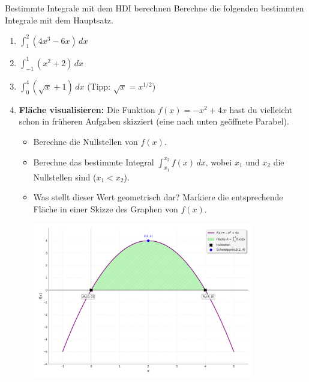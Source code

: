 \begin{aufgabenumgebung}{Bestimmte Integrale mit dem HDI berechnen}
Berechne die folgenden bestimmten Integrale mit dem Hauptsatz.
\begin{enumerate}
    \item $\int_{1}^{2} (4x^3 - 6x) \,dx$
    \item $\int_{-1}^{1} (x^2 + 2) \,dx$
    \item $\int_{0}^{4} (\sqrt{x} + 1) \,dx$ (Tipp: $\sqrt{x} = x^{1/2}$)
    \item \textbf{Fläche visualisieren:}
        Die Funktion $f(x) = -x^2 + 4x$ hast du vielleicht schon in früheren Aufgaben skizziert (eine nach unten geöffnete Parabel).
        \begin{itemize}
            \item Berechne die Nullstellen von $f(x)$.
            \item Berechne das bestimmte Integral $\int_{x_1}^{x_2} f(x) \,dx$, wobei $x_1$ und $x_2$ die Nullstellen sind ($x_1 < x_2$).
            \item Was stellt dieser Wert geometrisch dar? Markiere die entsprechende Fläche in einer Skizze des Graphen von $f(x)$.
\begin{center}
    \includegraphics[width=0.8\textwidth]{grafiken/Integral_Flaeche_Parabel.png}
    \label{fig:flaeche_parabel}
\end{center}
        \end{itemize}
\end{enumerate}
\end{aufgabenumgebung}


